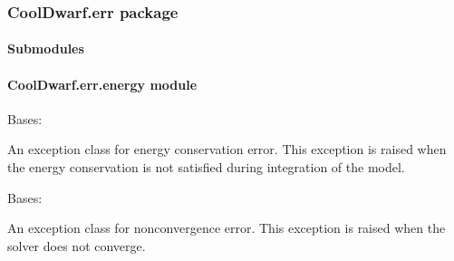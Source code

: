 \documentclass[letterpaper,10pt,english]{sphinxmanual}
\begin{document}
\subsubsection{CoolDwarf.err package}
\label{\detokenize{CoolDwarf.err:cooldwarf-err-package}}\label{\detokenize{CoolDwarf.err::doc}}

\paragraph{Submodules}
\label{\detokenize{CoolDwarf.err:submodules}}

\paragraph{CoolDwarf.err.energy module}
\label{\detokenize{CoolDwarf.err:module-CoolDwarf.err.energy}}\label{\detokenize{CoolDwarf.err:cooldwarf-err-energy-module}}

\begin{fulllineitems}
\label{\detokenize{CoolDwarf.err:CoolDwarf.err.energy.EnergyConservationError}}
\pysigstartsignatures
{}
\pysigstopsignatures
\sphinxAtStartPar
Bases: 

\sphinxAtStartPar
An exception class for energy conservation error. This exception is raised when the energy conservation is not
satisfied during integration of the model.

\end{fulllineitems}


\begin{fulllineitems}
\label{\detokenize{CoolDwarf.err:CoolDwarf.err.energy.NonConvergenceError}}
\pysigstartsignatures
{}
\pysigstopsignatures
\sphinxAtStartPar
Bases: 

\sphinxAtStartPar
An exception class for non\sphinxhyphen{}convergence error. This exception is raised when the solver does not converge.

\end{fulllineitems}
\end{document}
